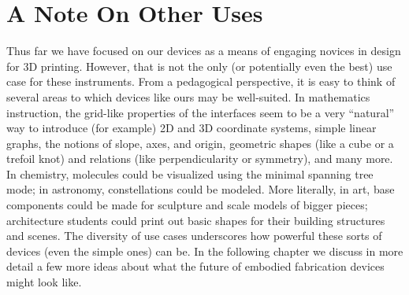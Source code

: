 \section{A Note On Other Uses}

Thus far we have focused on our devices as a means of engaging novices in design
for 3D printing. However, that is not the only (or potentially even the best)
use case for these instruments. From a pedagogical perspective, it is easy to
think of several areas to which devices like ours may be well-suited.
In mathematics instruction, the grid-like properties of the interfaces seem to
be a very ``natural'' way to introduce (for example) 2D and 3D coordinate
systems, simple linear graphs, the notions of slope, axes, and origin, geometric
shapes (like a cube or a trefoil knot) and relations (like perpendicularity or
symmetry), and many more. In chemistry, molecules could be visualized using the
minimal spanning tree mode; in astronomy, constellations could be modeled.
More literally, in art, base components could be made for sculpture and scale
models of bigger pieces; architecture students could print out basic shapes for
their building structures and scenes. The diversity of use cases underscores how
powerful these sorts of devices (even the simple ones) can be. In the following
chapter we discuss in more detail a few more ideas about what the future
of embodied fabrication devices might look like.
